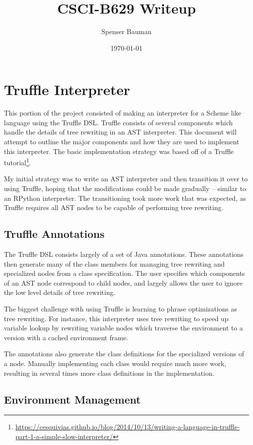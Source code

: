 \documentclass[8pt]{article}
\author{Spenser Bauman}
\title{CSCI-B629 Writeup}
\date{\today}
\begin{document}
\maketitle

\section{Truffle Interpreter}

This portion of the project consisted of making an interpreter for a Scheme like
language using the Truffle DSL.
Truffle consists of several components which handle the details of tree rewriting
in an AST interpreter.
This document will attempt to outline the major components and how they are used
to implement this interpreter.
The basic implementation strategy was based off of a Truffle
tutorial\footnote{\url{https://cesquivias.github.io/blog/2014/10/13/writing-a-language-in-truffle-part-1-a-simple-slow-interpreter/}}.

My initial strategy was to write an AST interpreter and then transition it over
to using Truffle, hoping that the modifications could be made gradually -- similar
to an RPython interpreter.
The transitioning took more work that was expected, as Truffle requires all AST
nodes to be capable of performing tree rewriting.

\subsection{Truffle Annotations}

The Truffle DSL consists largely of a set of Java annotations.
These annotations then generate many of the class members for managing tree
rewriting and specialized nodes from a class specification.
The user specifies which components of an AST node correspond to child nodes,
and largely allows the user to ignore the low level details of tree rewriting.

The biggest challenge with using Truffle is learning to phrase optimizations
as tree rewriting.
For instance, this interpreter uses tree rewriting to speed up variable lookup
by rewriting variable nodes which traverse the environment to a version with
a cached environment frame.

The annotations also generate the class definitions for the specialized versions
of a node.
Manually implementing each class would require much more work, resulting in several
times more class definitions in the implementation.

\subsection{Environment Management}
\end{document}
